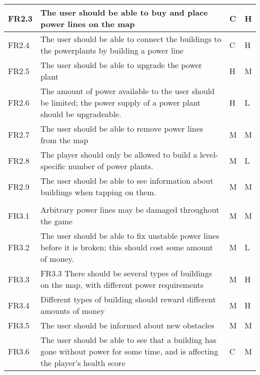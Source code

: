 \begin{longtable}{| p{1.5cm} | p{8cm} | p{1.5cm} | p{2cm} |}
      FR2.3 & The user should be able to buy and place power lines on the map & C & H \\ \hline

      FR2.4 & The user should be able to connect the buildings to the powerplants by building a power 
      line & C & H \\ \hline

      FR2.5 & The user should be able to upgrade the power plant & H & M \\ \hline

      FR2.6 & The amount of power available to the user should be limited; the power supply of a 
      power plant should be upgradeable. & H & L \\ \hline

      FR2.7 & The user should be able to remove power lines from the map & M & M \\ \hline

      FR2.8 & The player should only be allowed to build a level-specific number of power plants. & M & L \\ \hline

      FR2.9 & The user should be able to see information about buildings when tapping on them. & M & M \\ \hline
   \pagebreak
   \hline
   \multicolumn{4}{|>{\columncolor[gray]{.8}}l|}{3) Obstacles} \\ \hline

      FR3.1 & Arbitrary power lines may be damaged throughout the game & M & M \\ \hline

      FR3.2 & The user should be able to fix unstable power lines before it is broken; 
      this should cost some amount of money. & M & L \\ \hline

      FR3.3 & FR3.3 There should be several types of buildings on the map, with different power 
      requirements & M & H \\ \hline

      FR3.4 & Different types of building should reward different amounts of money & 
      M & H \\ \hline

      FR3.5 & The user should be informed about new obstacles & M & M \\ \hline

      FR3.6 & The user should be able to see that a building has gone without power 
      for some time, and is affecting the player's health score & C & M \\ \hline


\end{longtable}
